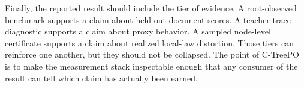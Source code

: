 Finally, the reported result should include the tier of evidence. A
root-observed benchmark supports a claim about held-out document scores. A
teacher-trace diagnostic supports a claim about proxy behavior. A sampled
node-level certificate supports a claim about realized local-law distortion.
Those tiers can reinforce one another, but they should not be
collapsed. The point of C-TreePO is to make the measurement stack
inspectable enough that any consumer of the result can tell which
claim has actually been earned.
